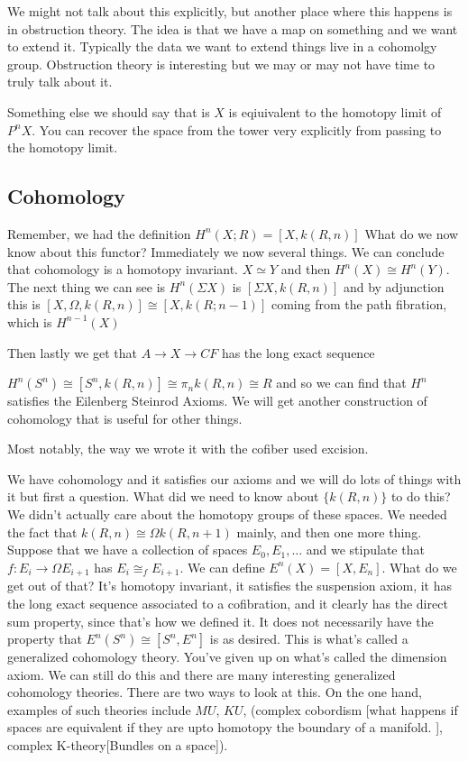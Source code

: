 \documentclass[12pt]{article}
\theoremstyle{definition}
\begin{document}
	We might not talk about this explicitly, but another place where this happens is in obstruction theory. The idea is that we have a map on something and we want to extend it. Typically the data we want to extend things live in a cohomolgy group. Obstruction theory is interesting but we may or may not have time to truly talk about it. 
	
	Something else we should say that is $X$ is eqiuivalent to the homotopy limit of $P^nX$. You can recover the space from the tower very explicitly from passing to the homotopy limit.
	\subsection{Cohomology}
	Remember, we had the definition	$H^n(X;R)=[X,k(R,n)]$ What do we now know about this functor? Immediately we now several things. We can conclude that cohomology is a homotopy invariant. $X\simeq Y$ and then $H^n(X)\cong H^n(Y)$. The next thing we can see is $H^n(\Sigma X)$ is $[\Sigma X,k(R,n)] $ and by adjunction this is $[X,\Omega, k(R,n)]\cong [X,k(R;n-1)]$ coming from the path fibration, which is $H^{n-1}(X)$
	
	Then lastly we get that $A\to X\to CF$ has the long exact sequence \begin{center}
	\end{center}
	
	$H^n(S^n)\cong [S^n,k(R,n)]\cong \pi_n k(R,n)\cong R$ and so we can find that $H^n$ satisfies the Eilenberg Steinrod Axioms. We will get another construction of cohomology that is useful for other things.
	
	Most notably, the way we wrote it with the cofiber used excision. 
	
	We have cohomology and it satisfies our axioms and we will do lots of things with it but first a question. What did we need to know about $\{k(R,n)\}$ to do this? We didn't actually care about the homotopy groups of these spaces. We needed the fact that $k(R,n)\cong \Omega k(R,n+1)$ mainly, and then one more thing. Suppose that we have a collection of spaces  $E_0, E_1,\dots $ and we stipulate that $f:E_i\to \Omega E_{i+1}$ has $E_i\cong_f E_{i+1}$. We can define $E^n(X)=[X,E_n]$. What do we get out of that? It's homotopy invariant, it satisfies the suspension axiom, it has the long exact sequence associated to a cofibration, and it clearly has the direct sum property, since that's how we defined it. It does not necessarily have the property that $E^n(S^n)\cong [S^n, E^n]$ is as desired. This is what's called a generalized cohomology theory. You've given up on what's called the dimension axiom. We can still do this and there are many interesting generalized cohomology theories. There are two ways to look at this. On the one hand, examples of such theories include $MU$, $KU$, (complex cobordism [what happens if spaces are equivalent if they are upto homotopy the boundary of a manifold. ], complex K-theory[Bundles on a space]). 
	
\end{document}
